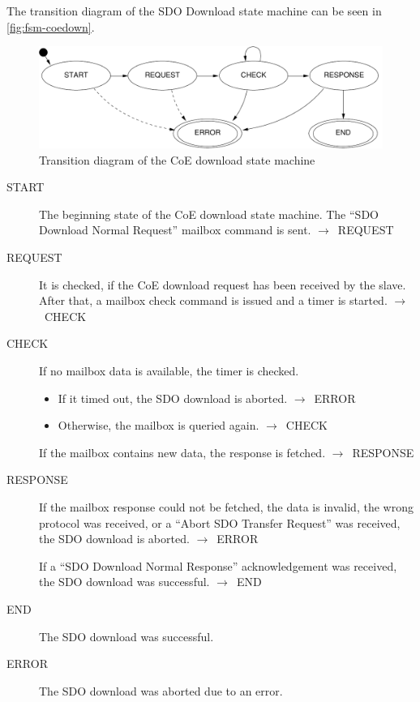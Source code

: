 \documentclass[a4paper,12pt,BCOR6mm,bibtotoc,idxtotoc]{scrbook}
\begin{document}
The transition diagram of the SDO Download state machine can be seen
in \autoref{fig:fsm-coedown}.

\begin{figure}[htbp]
  \centering
  \includegraphics[width=.9\textwidth]{images/fsm-coedown} %
  \caption{Transition diagram of the CoE download state machine}
  \label{fig:fsm-coedown}
\end{figure}


\begin{description}
\item[START] The beginning state of the CoE download state
  machine. The ``SDO Download Normal Request'' mailbox command is
  sent. $\rightarrow$~REQUEST

\item[REQUEST] It is checked, if the CoE download request has been
  received by the slave. After that, a mailbox check command is issued
  and a timer is started. $\rightarrow$~CHECK

\item[CHECK] If no mailbox data is available, the timer is checked.
  \begin{itemize}
  \item If it timed out, the SDO download is aborted.
    $\rightarrow$~ERROR
  \item Otherwise, the mailbox is queried again.
    $\rightarrow$~CHECK
  \end{itemize}

  If the mailbox contains new data, the response is fetched.
  $\rightarrow$~RESPONSE

\item[RESPONSE] If the mailbox response could not be fetched, the data
  is invalid, the wrong protocol was received, or a ``Abort SDO
  Transfer Request'' was received, the SDO download is aborted.
  $\rightarrow$~ERROR

  If a ``SDO Download Normal Response'' acknowledgement was received,
  the SDO download was successful. $\rightarrow$~END

\item[END] The SDO download was successful.

\item[ERROR] The SDO download was aborted due to an error.

\end{description}
\end{document}
